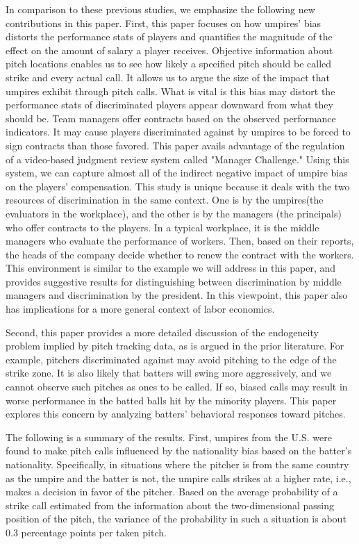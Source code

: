 \documentclass[dvipdfmx, 12pt]{jsarticle}
\begin{document}
In comparison to these previous studies, we emphasize the following new contributions in this paper. First, this paper focuses on how umpires' bias distorts the performance stats of players and quantifies the magnitude of the effect on the amount of salary a player receives. Objective information about pitch locations enables us to see how likely a specified pitch should be called strike and every actual call. It allows us to argue the size of the impact that umpires exhibit through pitch calls. What is vital is this bias may distort the performance stats of discriminated players appear downward from what they should be. Team managers offer contracts based on the observed performance indicators. It may cause players discriminated against by umpires to be forced to sign contracts than those favored. This paper avails advantage of the regulation of a video-based judgment review system called "Manager Challenge." Using this system, we can capture almost all of the indirect negative impact of umpire bias on the players' compensation. This study is unique because it deals with the two resources of discrimination in the same context. One is by the umpires(the evaluators in the workplace), and the other is by the managers (the principals) who offer contracts to the players. In a typical workplace, it is the middle managers who evaluate the performance of workers. Then, based on their reports, the heads of the company decide whether to renew the contract with the workers. This environment is similar to the example we will address in this paper, and provides suggestive results for distinguishing between discrimination by middle managers and discrimination by the president. In this viewpoint, this paper also has implications for a more general context of labor economics.

Second, this paper provides a more detailed discussion of the endogeneity problem implied by pitch tracking data, as is argued in the prior literature. For example, pitchers discriminated against may avoid pitching to the edge of the strike zone. It is also likely that batters will swing more aggressively, and we cannot observe such pitches as ones to be called. If so, biased calls may result in worse performance in the batted balls hit by the minority players. This paper explores this concern by analyzing batters' behavioral responses toward pitches.

The following is a summary of the results. First, umpires from the U.S. were found to make pitch calls influenced by the nationality bias based on the batter's nationality. Specifically, in situations where the pitcher is from the same country as the umpire and the batter is not, the umpire calls strikes at a higher rate, i.e., makes a decision in favor of the pitcher. Based on the average probability of a strike call estimated from the information about the two-dimensional passing position of the pitch, the variance of the probability in such a situation is about 0.3 percentage points per taken pitch.
\end{document}

